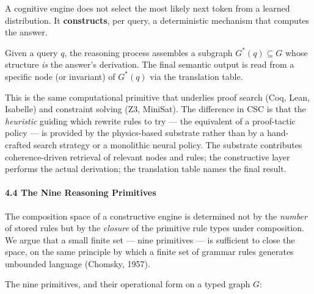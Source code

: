 \documentclass[
  11pt,
  a4paper,
]{article}
\begin{document}
A cognitive engine does not select the most likely next token from a
learned distribution. It \textbf{constructs}, per query, a deterministic
mechanism that computes the answer.

Given a query \(q\), the reasoning process assembles a subgraph
\(G^*(q) \subseteq G\) whose structure \emph{is} the answer's
derivation. The final semantic output is read from a specific node (or
invariant) of \(G^*(q)\) via the translation table.

This is the same computational primitive that underlies proof search
(Coq, Lean, Isabelle) and constraint solving (Z3, MiniSat). The
difference in CSC is that the \emph{heuristic} guiding which rewrite
rules to try --- the equivalent of a proof-tactic policy --- is provided
by the physics-based substrate rather than by a hand-crafted search
strategy or a monolithic neural policy. The substrate contributes
coherence-driven retrieval of relevant nodes and rules; the constructive
layer performs the actual derivation; the translation table names the
final result.

\paragraph{4.4 The Nine Reasoning
Primitives}\label{the-nine-reasoning-primitives}

The composition space of a constructive engine is determined not by the
\emph{number} of stored rules but by the \emph{closure} of the primitive
rule types under composition. We argue that a small finite set --- nine
primitives --- is sufficient to close the space, on the same principle
by which a finite set of grammar rules generates unbounded language
(Chomsky, 1957).

The nine primitives, and their operational form on a typed graph \(G\):
\end{document}
